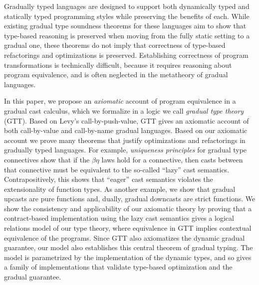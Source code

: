 Gradually typed languages are designed to support both dynamically typed
and statically typed programming styles while preserving the benefits of
each.  While existing gradual type soundness theorems for these
languages aim to show that type-based reasoning is preserved when
moving from the fully static setting to a gradual one, these theorems do
not imply that correctness of type-based refactorings and optimizations
is preserved.  Establishing correctness of program transformations is
technically difficult, because it requires reasoning about program
equivalence, and is often neglected in the metatheory of gradual
languages.  

In this paper, we propose an \emph{axiomatic} account of
program equivalence in a gradual cast calculus, which we formalize in a
logic we call \emph{gradual type theory} (GTT). Based on Levy's
call-by-push-value, GTT gives an axiomatic account of both call-by-value
and call-by-name gradual languages.  Based on our axiomatic account we
prove many theorems that justify optimizations and refactorings in
gradually typed languages. For example, 
\emph{uniqueness principles} for gradual type connectives show that if the
$\beta\eta$ laws hold for a connective, then casts between that
connective must be equivalent to the so-called ``lazy'' cast semantics.
Contrapositively, this shows that ``eager'' cast semantics violates the
extensionality of function types.  As another example, we show that
gradual upcasts are pure functions and, dually, gradual downcasts are
strict functions.  We show the consistency and applicability of our
axiomatic theory by proving that a contract-based implementation using
the lazy cast semantics gives a logical relations model of our type
theory, where equivalence in GTT implies contextual equivalence of the
programs.  Since GTT also axiomatizes the dynamic gradual guarantee, our
model also establishes this central theorem of gradual typing.  The
model is parametrized by the implementation of the dynamic types, and so
gives a family of implementations that validate type-based optimization
and the gradual guarantee.
